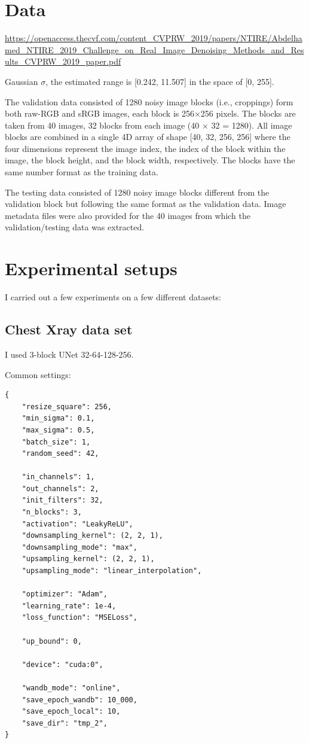 \documentclass[12pt]{article}
\begin{document}
\section{Data}



\url{https://openaccess.thecvf.com/content_CVPRW_2019/papers/NTIRE/Abdelhamed_NTIRE_2019_Challenge_on_Real_Image_Denoising_Methods_and_Results_CVPRW_2019_paper.pdf}

Gaussian $\sigma$, the estimated range is [0.242, 11.507]
in the space of [0, 255].

The validation data consisted of 1280 noisy image blocks
(i.e., croppings) form both raw-RGB and sRGB images,
each block is 256×256 pixels. The blocks are taken from 40
images, 32 blocks from each image (40 × 32 = 1280). All
image blocks are combined in a single 4D array of shape
[40, 32, 256, 256] where the four dimensions represent the
image index, the index of the block within the image, the
block height, and the block width, respectively. The blocks
have the same number format as the training data. 

The testing data consisted of 1280 noisy image blocks different from the validation block but following the same format
as the validation data. Image metadata files were also provided for the 40 images from which the validation/testing
data was extracted.




\section{Experimental setups}

I carried out a few experiments on a few different datasets:

\subsection{Chest Xray data set}

I used 3-block UNet 32-64-128-256. 

Common settings:

\begin{verbatim}
{
    "resize_square": 256,
    "min_sigma": 0.1,
    "max_sigma": 0.5,
    "batch_size": 1,
    "random_seed": 42,

    "in_channels": 1,
    "out_channels": 2,
    "init_filters": 32,
    "n_blocks": 3,
    "activation": "LeakyReLU",
    "downsampling_kernel": (2, 2, 1),
    "downsampling_mode": "max",
    "upsampling_kernel": (2, 2, 1),
    "upsampling_mode": "linear_interpolation",

    "optimizer": "Adam",
    "learning_rate": 1e-4,
    "loss_function": "MSELoss",

    "up_bound": 0,
    
    "device": "cuda:0",

    "wandb_mode": "online",
    "save_epoch_wandb": 10_000,
    "save_epoch_local": 10,
    "save_dir": "tmp_2",
}
\end{verbatim}
\end{document}
